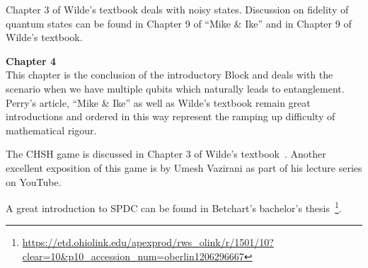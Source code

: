 Chapter 3 of Wilde’s textbook deals with noisy states. Discussion on fidelity of quantum states can be found in Chapter 9 of “Mike \& Ike” and in Chapter 9 of Wilde’s textbook.

{\bf Chapter 4}\\

This chapter is the conclusion of the introductory Block and deals with the scenario when we have multiple qubits which naturally leads to entanglement. Perry’s article, “Mike \& Ike” as well as Wilde’s textbook remain great introductions and ordered in this way represent the ramping up difficulty of mathematical rigour. 

The CHSH game is discussed in Chapter 3 of Wilde’s textbook~\cite{wilde2013quantum}. Another excellent exposition of this game is by Umesh Vazirani as part of his lecture series on YouTube.

A great introduction to SPDC can be found in Betchart’s bachelor's thesis~\footnote{\url{https://etd.ohiolink.edu/apexprod/rws_olink/r/1501/10?clear=10&p10_accession_num=oberlin1206296667}}.

